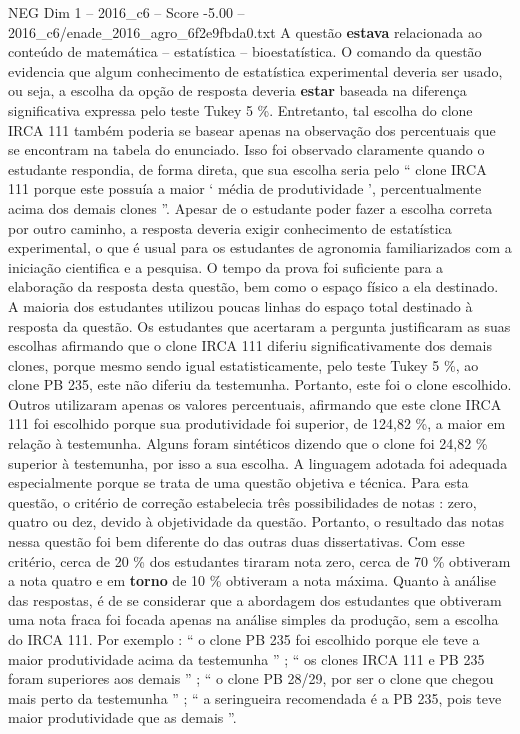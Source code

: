 \begin{textsample}{NEG Dim 1 – 2016\_c6 – Score -5.00 – 2016\_c6/enade\_2016\_agro\_6f2e9fbda0.txt}
A questão \textbf{estava} relacionada ao conteúdo de matemática – estatística – bioestatística.
O comando da questão evidencia que algum conhecimento de estatística experimental deveria ser usado, ou seja, a escolha da opção de resposta deveria \textbf{estar} baseada na diferença significativa expressa pelo teste Tukey 5 \%.
Entretanto, tal escolha do clone IRCA 111 também poderia se basear apenas na observação dos percentuais que se encontram na tabela do enunciado.
Isso foi observado claramente quando o estudante respondia, de forma direta, que sua escolha seria pelo “ clone IRCA 111 porque este possuía a maior ‘ média de produtividade ’, percentualmente acima dos demais clones ”.
Apesar de o estudante poder fazer a escolha correta por outro caminho, a resposta deveria exigir conhecimento de estatística experimental, o que é usual para os estudantes de agronomia familiarizados com a iniciação cientifica e a pesquisa.
O tempo da prova foi suficiente para a elaboração da resposta desta questão, bem como o espaço físico a ela destinado.
A maioria dos estudantes utilizou poucas linhas do espaço total destinado à resposta da questão.
Os estudantes que acertaram a pergunta justificaram as suas escolhas afirmando que o clone IRCA 111 diferiu significativamente dos demais clones, porque mesmo sendo igual estatisticamente, pelo teste Tukey 5 \%, ao clone PB 235, este não diferiu da testemunha.
Portanto, este foi o clone escolhido.
Outros utilizaram apenas os valores percentuais, afirmando que este clone IRCA 111 foi escolhido porque sua produtividade foi superior, de 124,82 \%, a maior em relação à testemunha.
Alguns foram sintéticos dizendo que o clone foi 24,82 \% superior à testemunha, por isso a sua escolha.
A linguagem adotada foi adequada especialmente porque se trata de uma questão objetiva e técnica.
Para esta questão, o critério de correção estabelecia três possibilidades de notas : zero, quatro ou dez, devido à objetividade da questão.
Portanto, o resultado das notas nessa questão foi bem diferente do das outras duas dissertativas.
Com esse critério, cerca de 20 \% dos estudantes tiraram nota zero, cerca de 70 \% obtiveram a nota quatro e em \textbf{torno} de 10 \% obtiveram a nota máxima.
Quanto à análise das respostas, é de se considerar que a abordagem dos estudantes que obtiveram uma nota fraca foi focada apenas na análise simples da produção, sem a escolha do IRCA 111.
Por exemplo : “ o clone PB 235 foi escolhido porque ele teve a maior produtividade acima da testemunha ” ; “ os clones IRCA 111 e PB 235 foram superiores aos demais ” ; “ o clone PB 28/29, por ser o clone que chegou mais perto da testemunha ” ; “ a seringueira recomendada é a PB 235, pois teve maior produtividade que as demais ”.

\end{textsample}
